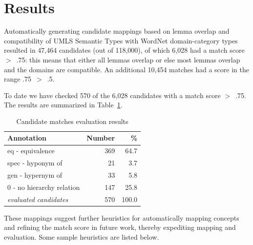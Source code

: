 \documentclass[11pt]{article}
\begin{document}
 
\section{Results}

Automatically generating candidate mappings based on lemma overlap and compatibility of UMLS Semantic Types with WordNet domain-category types resulted in 47,464 candidates (out of 118,000), of which 6,028 had a match score $>$~.75: this means that either all lemmas overlap or else most lemmas overlap and the domains are compatible. An additional 10,454 matches had a score in the range .75~$>$~.5.

To date we have checked 570 of the 6,028 candidates with a match score $>$~.75. The results are summarized in Table~\ref{match_results}.
\begin{table}[h]
\begin{center}
\begin{tabular}{|l|r|r|}
\hline
\bf Annotation & \bf Number & \bf \%\\
\hline
eq - equivalence & 369 & 64.7\\
spec - hyponym of  & 21 & 3.7\\
gen - hypernym of & 33 & 5.8 \\
0 - no hierarchy relation & 147 & 25.8\\
\hline
\it evaluated candidates  & 570 & 100.0\\
\hline
\end{tabular}
\end{center}
\caption{\label{Candidate matches evaluation results}Candidate matches evaluation results }
\label{match_results}
\end{table}



These mappings suggest further heuristics for automatically mapping concepts and refining the match score in future work, thereby expediting mapping and evaluation. Some sample heuristics are listed below.
\end{document}

